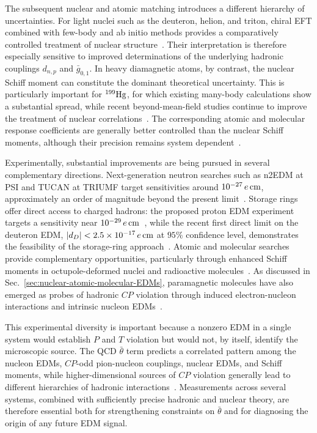 \documentclass[review]{elsarticle}
\numberwithin{equation}{section}
\numberwithin{table}{section}
\numberwithin{figure}{section}
\begin{document}
The subsequent nuclear and atomic matching introduces a different hierarchy of uncertainties. For light nuclei such as the deuteron, helion, and triton, chiral EFT combined with few-body and ab initio methods provides a comparatively controlled treatment of nuclear structure~\cite{Dekens:2014jka,Bsaisou:2014oka,Yamanaka:2016umw}. Their interpretation is therefore especially sensitive to improved determinations of the underlying hadronic couplings $d_{n,p}$ and $\bar g_{0,1}$. In heavy diamagnetic atoms, by contrast, the nuclear Schiff moment can constitute the dominant theoretical uncertainty. This is particularly important for $^{199}{\rm Hg}$, for which existing many-body calculations show a substantial spread, while recent beyond-mean-field studies continue to improve the treatment of nuclear correlations~\cite{Engel:2025uci,Pospelov:2025vzj,Zhou:2025jfi}. The corresponding atomic and molecular response coefficients are generally better controlled than the nuclear Schiff moments, although their precision remains system dependent~\cite{Safronova:2017xyt,Pospelov:2025vzj}.

Experimentally, substantial improvements are being pursued in several complementary directions. Next-generation neutron searches such as n2EDM at PSI and TUCAN at TRIUMF target sensitivities around $10^{-27}\,e\,{\rm cm}$, approximately an order of magnitude beyond the present limit~\cite{n2EDM:2021yah,TUCAN:2025rjm}. Storage rings offer direct access to charged hadrons: the proposed proton EDM experiment targets a sensitivity near $10^{-29}\,e\,{\rm cm}$~\cite{pEDM:2022ytu}, while the recent first direct limit on the deuteron EDM,
$|d_D|<2.5\times10^{-17}\,e\,{\rm cm}$ at $95\%$ confidence level, demonstrates the feasibility of the storage-ring approach~\cite{JEDI:2026dwx}. Atomic and molecular searches provide complementary opportunities, particularly through enhanced Schiff moments in octupole-deformed nuclei and radioactive molecules~\cite{Engel:2025uci,Arrowsmith-Kron:2023hcr}. As discussed in Sec.~\ref{sec:nuclear-atomic-molecular-EDMs}, paramagnetic molecules have also emerged as probes of hadronic $CP$ violation through induced electron-nucleon interactions and intrinsic nucleon EDMs~\cite{Mulder:2025esr,Dekens:2025skl,deVries:2026quu}.

This experimental diversity is important because a nonzero EDM in a single system would establish $P$ and $T$ violation but would not, by itself, identify the microscopic source. The QCD $\bar\theta$ term predicts a correlated pattern among the nucleon EDMs, $CP$-odd pion-nucleon couplings, nuclear EDMs, and Schiff moments, while higher-dimensional sources of $CP$ violation generally lead to different hierarchies of hadronic interactions~\cite{deVries:2012ab,Bsaisou:2014oka,Pospelov:2025vzj}. Measurements across several systems, combined with sufficiently precise hadronic and nuclear theory, are therefore essential both for strengthening constraints on $\bar\theta$ and for diagnosing the origin of any future EDM signal.
\end{document}
